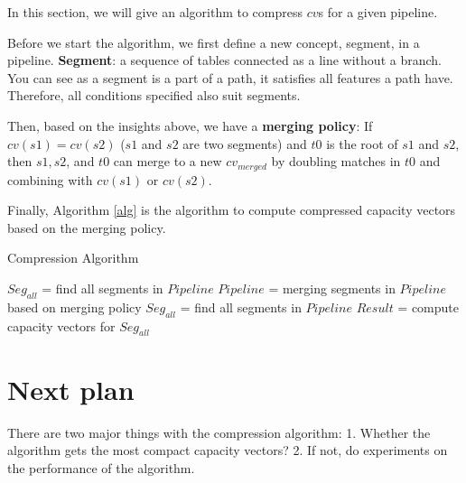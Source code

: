 \documentclass{article}
\begin{document}
In this section, we will give an algorithm to compress $cv$s for a given pipeline.

Before we start the algorithm, we first define a new concept, segment, in a pipeline. \textbf{Segment}: a sequence of tables connected as a line without a branch. You can see as a segment is a part of a path, it satisfies all features a path have. Therefore, all conditions specified also suit segments.

Then, based on the insights above, we have a \textbf{merging policy}: If $cv(s1) = cv(s2)$ ($s1$ and $s2$ are two segments) and $t0$ is the root of $s1$ and $s2$, then $s1, s2$, and $t0$ can merge to a new $cv_{merged}$ by doubling matches in $t0$ and combining with $cv(s1)$ or $cv(s2)$.

Finally, Algorithm \ref{alg} is the algorithm to compute compressed capacity vectors based on the merging policy.

\begin{algorithm}
\caption{Compression Algorithm}\label{alg}
\begin{algorithmic}[1]
\State $Seg_{all}$ = find all segments in $Pipeline$
\State $Pipeline$ = merging segments in $Pipeline$ based on merging policy
\State $Seg_{all}$ = find all segments in $Pipeline$
\EndWhile
\State $Result$ = compute capacity vectors for $Seg_{all}$
\end{algorithmic}
\end{algorithm}
   
\section{Next plan}

There are two major things with the compression algorithm: 1. Whether the algorithm gets the most compact capacity vectors? 2. If not, do experiments on the performance of the algorithm.
   
\end{document}
